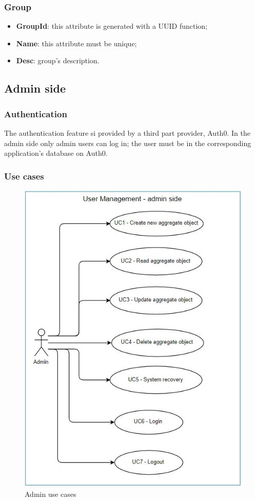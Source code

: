 \subsubsection{Group}
\begin{itemize}
	\item \textbf{GroupId}: this attribute is generated with a UUID function;
	\item \textbf{Name}: this attribute must be unique;
	\item \textbf{Desc}: group's description.
\end{itemize}

\subsection{Admin side}
\subsubsection{Authentication}
The authentication feature si provided by a third part provider, Auth0. In the admin side only admin users can log in; the user must be in the corresponding application's database on Auth0.
\subsubsection{Use cases}

\begin{figure} [H]
	\centering
	\includegraphics[scale=1.2]{../Img/UC_admin}
	\caption{Admin use cases}\label{}
\end{figure}

